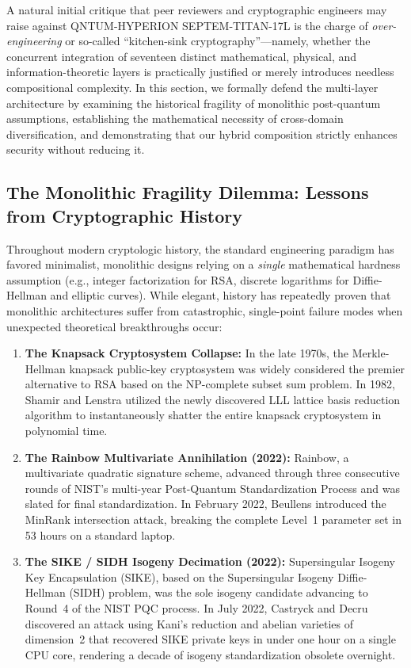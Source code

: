 \documentclass{ieeeaccess}
\begin{document}
A natural initial critique that peer reviewers and cryptographic engineers may raise against \textsc{QNTUM-HYPERION SEPTEM-TITAN-17L} is the charge of \emph{over-engineering} or so-called ``kitchen-sink cryptography''---namely, whether the concurrent integration of seventeen distinct mathematical, physical, and information-theoretic layers is practically justified or merely introduces needless compositional complexity. In this section, we formally defend the multi-layer architecture by examining the historical fragility of monolithic post-quantum assumptions, establishing the mathematical necessity of cross-domain diversification, and demonstrating that our hybrid composition strictly enhances security without reducing it.

\subsection{The Monolithic Fragility Dilemma: Lessons from Cryptographic History}
Throughout modern cryptologic history, the standard engineering paradigm has favored minimalist, monolithic designs relying on a \emph{single} mathematical hardness assumption (e.g., integer factorization for RSA, discrete logarithms for Diffie-Hellman and elliptic curves). While elegant, history has repeatedly proven that monolithic architectures suffer from catastrophic, single-point failure modes when unexpected theoretical breakthroughs occur:
\begin{enumerate}
  \item \textbf{The Knapsack Cryptosystem Collapse:} In the late 1970s, the Merkle-Hellman knapsack public-key cryptosystem was widely considered the premier alternative to RSA based on the NP-complete subset sum problem. In 1982, Shamir and Lenstra utilized the newly discovered LLL lattice basis reduction algorithm to instantaneously shatter the entire knapsack cryptosystem in polynomial time.
  \item \textbf{The Rainbow Multivariate Annihilation (2022):} Rainbow, a multivariate quadratic signature scheme, advanced through three consecutive rounds of NIST's multi-year Post-Quantum Standardization Process and was slated for final standardization. In February 2022, Beullens introduced the MinRank intersection attack, breaking the complete Level~1 parameter set in 53 hours on a standard laptop.
  \item \textbf{The SIKE / SIDH Isogeny Decimation (2022):} Supersingular Isogeny Key Encapsulation (SIKE), based on the Supersingular Isogeny Diffie-Hellman (SIDH) problem, was the sole isogeny candidate advancing to Round~4 of the NIST PQC process. In July 2022, Castryck and Decru discovered an attack using Kani's reduction and abelian varieties of dimension~2 that recovered SIKE private keys in under one hour on a single CPU core, rendering a decade of isogeny standardization obsolete overnight.
\end{enumerate}
\end{document}
